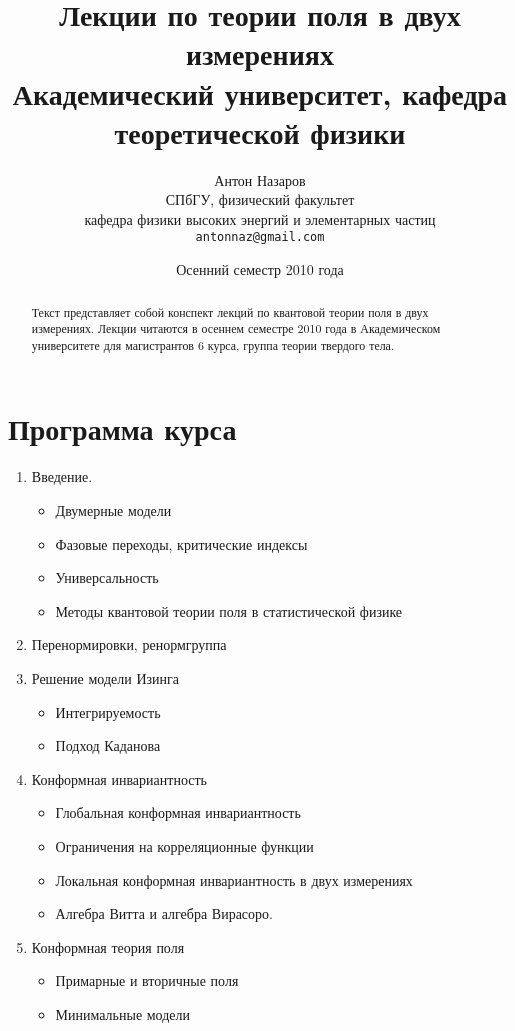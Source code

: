\documentclass[a4paper,12pt]{article}
\title{Лекции по теории поля в двух измерениях\\
\small{Академический университет, кафедра теоретической физики}
}
\author{Антон Назаров\\
  \small{СПбГУ, физический факультет}\\
  \small{кафедра физики высоких энергий и элементарных частиц}\\
  \texttt{antonnaz@gmail.com}
}
\date{Осенний семестр 2010 года}
\theoremstyle{definition}
\theoremstyle{definition}
\theoremstyle{definition}
\begin{document}
\maketitle
\begin{abstract}
  Текст представляет собой конспект лекций по квантовой теории поля в двух измерениях. Лекции читаются в осеннем семестре 2010 года в Академическом университете для магистрантов 6 курса, группа теории твердого тела. 
\end{abstract}

\section{Программа курса}
\label{sec:program}
\begin{enumerate}
\item Введение.
  \begin{itemize}
  \item Двумерные модели
  \item Фазовые переходы, критические индексы
  \item Универсальность
  \item Методы квантовой теории поля в статистической физике
  \end{itemize}
\item Перенормировки, ренормгруппа
\item Решение модели Изинга
  \begin{itemize}
  \item Интегрируемость
  \item Подход Каданова
  \end{itemize}
\item Конформная инвариантность
  \begin{itemize}
  \item Глобальная конформная инвариантность
  \item Ограничения на корреляционные функции
  \item Локальная конформная инвариантность в двух измерениях
  \item Алгебра Витта и алгебра Вирасоро.
  \end{itemize}
\item Конформная теория поля
  \begin{itemize}
  \item Примарные и вторичные поля
  \item Минимальные модели
  \end{itemize}
\end{enumerate}
\end{document}
